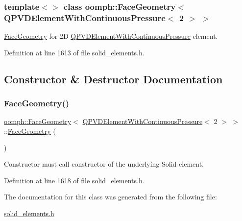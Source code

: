 \subsubsection*{template$<$$>$\newline
class oomph\+::\+Face\+Geometry$<$ Q\+P\+V\+D\+Element\+With\+Continuous\+Pressure$<$ 2 $>$ $>$}

\hyperlink{classoomph_1_1FaceGeometry}{Face\+Geometry} for 2D \hyperlink{classoomph_1_1QPVDElementWithContinuousPressure}{Q\+P\+V\+D\+Element\+With\+Continuous\+Pressure} element. 

Definition at line 1613 of file solid\+\_\+elements.\+h.



\subsection{Constructor \& Destructor Documentation}
\mbox{\label{classoomph_1_1FaceGeometry_3_01QPVDElementWithContinuousPressure_3_012_01_4_01_4_ac153b3a13943b0c907d4228d11fdf00d}} 
\subsubsection{\texorpdfstring{Face\+Geometry()}{FaceGeometry()}}
{\footnotesize\ttfamily \hyperlink{classoomph_1_1FaceGeometry}{oomph\+::\+Face\+Geometry}$<$ \hyperlink{classoomph_1_1QPVDElementWithContinuousPressure}{Q\+P\+V\+D\+Element\+With\+Continuous\+Pressure}$<$ 2 $>$ $>$\+::\hyperlink{classoomph_1_1FaceGeometry}{Face\+Geometry} (\begin{DoxyParamCaption}{ }\end{DoxyParamCaption})\hspace{0.3cm}{\ttfamily [inline]}}



Constructor must call constructor of the underlying Solid element. 



Definition at line 1618 of file solid\+\_\+elements.\+h.



The documentation for this class was generated from the following file\+:\begin{DoxyCompactItemize}
\item 
\hyperlink{solid__elements_8h}{solid\+\_\+elements.\+h}\end{DoxyCompactItemize}

